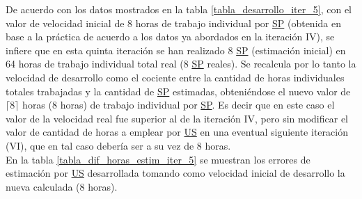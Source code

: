\documentclass[a4paper, 12pt,twoside]{report}  %
\numberwithin{equation}{subsection} %
\begin{document}
De acuerdo con los datos mostrados en la tabla \ref{tabla_desarrollo_iter_5}, con el valor de velocidad inicial de 8 horas de trabajo individual por \hyperlink{SP}{SP} (obtenida en base a la práctica de acuerdo a los datos ya abordados en la iteración IV), se infiere que en esta quinta iteración se han realizado 8 \hyperlink{SP}{SP} (estimación inicial) en 64 horas de trabajo individual total real (8 \hyperlink{SP}{SP} reales). Se recalcula por lo tanto la velocidad de desarrollo como el cociente entre la cantidad de horas individuales totales trabajadas y la cantidad de \hyperlink{SP}{SP} estimadas, obteniéndose el nuevo valor de \begin{math}\lceil 8\rceil\end{math} horas (8 horas) de trabajo individual por \hyperlink{SP}{SP}. Es decir que en este caso el valor de la velocidad real fue superior al de la iteración IV, pero sin modificar el valor de cantidad de horas a emplear por \hyperlink{US}{US} en una eventual siguiente iteración (VI), que en tal caso debería ser a su vez de 8 horas.\\
\indent En la tabla \ref{tabla_dif_horas_estim_iter_5} se muestran los errores de estimación por \hyperlink{US}{US} desarrollada tomando como velocidad inicial de desarrollo la nueva calculada (8 horas).
\end{document}
